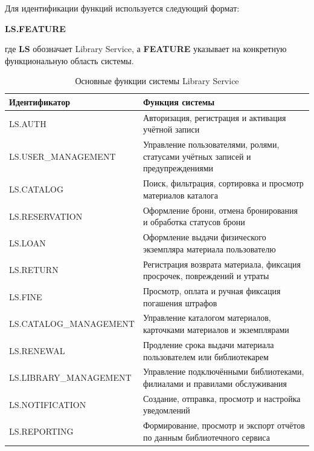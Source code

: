 \documentclass[12pt,a4paper]{article}
\begin{document}
	Для идентификации функций используется следующий формат:
	
	\begin{center}
		\textbf{LS.FEATURE}
	\end{center}
	
	где \textbf{LS} обозначает Library Service, а \textbf{FEATURE} указывает на
	конкретную функциональную область системы.
	
	\begin{table}[h]
		\centering
		\begin{tabularx}{\textwidth}{|>{\raggedright\arraybackslash}p{6.2cm}|>{\raggedright\arraybackslash}X|}
			\hline
			\textbf{Идентификатор} & \textbf{Функция системы} \\
			\hline
			LS.AUTH & Авторизация, регистрация и активация учётной записи \\
			\hline
			LS.USER\_MANAGEMENT & Управление пользователями, ролями, статусами учётных записей и предупреждениями \\
			\hline
			LS.CATALOG & Поиск, фильтрация, сортировка и просмотр материалов каталога \\
			\hline
			LS.RESERVATION & Оформление брони, отмена бронирования и обработка статусов брони \\
			\hline
			LS.LOAN & Оформление выдачи физического экземпляра материала пользователю \\
			\hline
			LS.RETURN & Регистрация возврата материала, фиксация просрочек, повреждений и утраты \\
			\hline
			LS.FINE & Просмотр, оплата и ручная фиксация погашения штрафов \\
			\hline
			LS.CATALOG\_MANAGEMENT & Управление каталогом материалов, карточками материалов и экземплярами \\
			\hline
			LS.RENEWAL & Продление срока выдачи материала пользователем или библиотекарем \\
			\hline
			LS.LIBRARY\_MANAGEMENT & Управление подключёнными библиотеками, филиалами и правилами обслуживания \\
			\hline
			LS.NOTIFICATION & Создание, отправка, просмотр и настройка уведомлений \\
			\hline
			LS.REPORTING & Формирование, просмотр и экспорт отчётов по данным библиотечного сервиса \\
			\hline
		\end{tabularx}
		\caption{Основные функции системы Library Service}
		\label{tab:system-features}
	\end{table}
	
\end{document}
